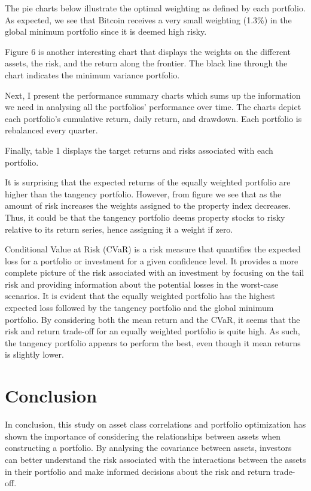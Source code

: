 \documentclass[11pt,preprint, authoryear]{elsarticle}
\numberwithin{equation}{section}
\numberwithin{figure}{section}
\numberwithin{table}{section}
\begin{document}
The pie charts below illustrate the optimal weighting as defined by each
portfolio. As expected, we see that Bitcoin receives a very small
weighting (1.3\%) in the global minimum portfolio since it is deemed
high risky.

Figure 6 is another interesting chart that displays the weights on the
different assets, the risk, and the return along the frontier. The black
line through the chart indicates the minimum variance portfolio.

Next, I present the performance summary charts which sums up the
information we need in analysing all the portfolios' performance over
time. The charts depict each portfolio's cumulative return, daily
return, and drawdown. Each portfolio is rebalanced every quarter.

Finally, table 1 displays the target returns and risks associated with
each portfolio.

It is surprising that the expected returns of the equally weighted
portfolio are higher than the tangency portfolio. However, from figure
we see that as the amount of risk increases the weights assigned to the
property index decreases. Thus, it could be that the tangency portfolio
deems property stocks to risky relative to its return series, hence
assigning it a weight if zero.

Conditional Value at Risk (CVaR) is a risk measure that quantifies the
expected loss for a portfolio or investment for a given confidence
level. It provides a more complete picture of the risk associated with
an investment by focusing on the tail risk and providing information
about the potential losses in the worst-case scenarios. It is evident
that the equally weighted portfolio has the highest expected loss
followed by the tangency portfolio and the global minimum portfolio. By
considering both the mean return and the CVaR, it seems that the risk
and return trade-off for an equally weighted portfolio is quite high. As
such, the tangency portfolio appears to perform the best, even though it
mean returns is slightly lower.

\hypertarget{conclusion}{%
\section{Conclusion}\label{conclusion}}

In conclusion, this study on asset class correlations and portfolio
optimization has shown the importance of considering the relationships
between assets when constructing a portfolio. By analysing the
covariance between assets, investors can better understand the risk
associated with the interactions between the assets in their portfolio
and make informed decisions about the risk and return trade-off.
\end{document}
